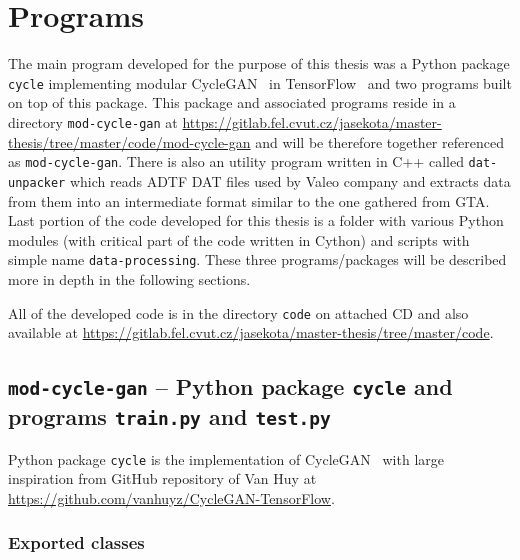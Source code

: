 \chapter{Programs} \label{programs}

The main program developed for the purpose of this thesis was a Python package \texttt{cycle} implementing modular CycleGAN~\cite{cyclegan} in TensorFlow~\cite{tensorflow} and two programs built on top of this package. This package and associated programs reside in a directory \texttt{mod-cycle-gan} at \url{https://gitlab.fel.cvut.cz/jasekota/master-thesis/tree/master/code/mod-cycle-gan} and will be therefore together referenced as \texttt{mod-cycle-gan}. There is also an utility program written in C++ called \texttt{dat-unpacker} which reads ADTF DAT files used by Valeo company and extracts data from them into an intermediate format similar to the one gathered from GTA. Last portion of the code developed for this thesis is a folder with various Python modules (with critical part of the code written in Cython) and scripts with simple name \texttt{data-processing}. These three programs/packages will be described more in depth in the following sections.

All of the developed code is in the directory \texttt{code} on attached CD and also available at \url{https://gitlab.fel.cvut.cz/jasekota/master-thesis/tree/master/code}.

\section[\texttt{mod-cycle-gan}]{\texttt{mod-cycle-gan} -- Python package \texttt{cycle} and programs \texttt{train.py} and \texttt{test.py}}

Python package \texttt{cycle} is the implementation of CycleGAN~\cite{cyclegan} with large inspiration from GitHub repository of Van Huy at \url{https://github.com/vanhuyz/CycleGAN-TensorFlow}.

\subsection{Exported classes}


